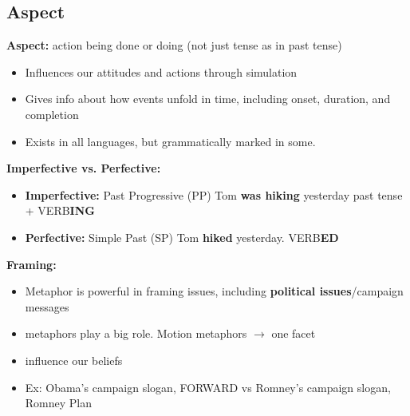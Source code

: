 \documentclass{article}
\begin{document}
\subsection{Aspect}
\textbf{Aspect:} action being done or doing (not just tense as in past tense) 
\begin{itemize}
    \item Influences our attitudes and actions through simulation
    \item Gives info about how events unfold in time, including onset, duration, and completion
    \item Exists in all languages, but grammatically marked in some. 
\end{itemize} 

\noindent \textbf{Imperfective vs. Perfective:}
\begin{itemize}
    \item \textbf{Imperfective:} Past Progressive (PP)
        \subitem Tom \textbf{was hiking} yesterday
        \subitem past tense + VERB\textbf{ING}
    \item \textbf{Perfective:} Simple Past (SP)
        \subitem Tom \textbf{hiked} yesterday.
        \subitem VERB\textbf{ED}
\end{itemize}

\noindent \textbf{Framing:} 
\begin{itemize}
    \item Metaphor is powerful in framing issues, including \textbf{political issues}/campaign messages
    \item metaphors play a big role. Motion metaphors $\rightarrow$ one facet
    \item influence our beliefs
    \item Ex: Obama's campaign slogan, FORWARD vs Romney's campaign slogan, Romney Plan 
\end{itemize}
\end{document}
